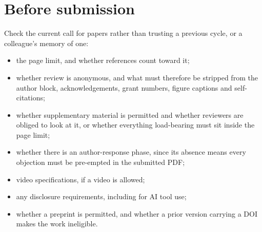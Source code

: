 \documentclass[11pt,a4paper]{article}
\begin{document}
\section*{Before submission}

Check the current call for papers rather than trusting a previous cycle, or
a colleague's memory of one:

\begin{itemize}
  \item the page limit, and whether references count toward it;
  \item whether review is anonymous, and what must therefore be stripped from
    the author block, acknowledgements, grant numbers, figure captions and
    self-citations;
  \item whether supplementary material is permitted and whether reviewers are
    obliged to look at it, or whether everything load-bearing must sit inside
    the page limit;
  \item whether there is an author-response phase, since its absence means
    every objection must be pre-empted in the submitted PDF;
  \item video specifications, if a video is allowed;
  \item any disclosure requirements, including for AI tool use;
  \item whether a preprint is permitted, and whether a prior version carrying
    a DOI makes the work ineligible.
\end{itemize}
\end{document}
